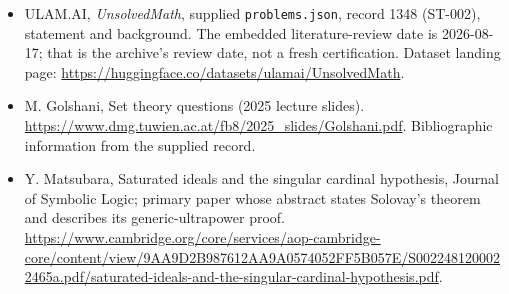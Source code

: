 \documentclass[11pt,a4paper]{article}
\begin{document}
{\small

\begin{itemize}

\item[\hypertarget{source:1348:1}{S1}] ULAM.AI, \emph{UnsolvedMath}, supplied \texttt{problems.json}, record 1348 (ST-002), statement and background. The embedded literature-review date is 2026-08-17; that is the archive’s review date, not a fresh certification. Dataset landing page: \url{https://huggingface.co/datasets/ulamai/UnsolvedMath}.

\item[\hypertarget{source:1348:2}{S2}] M. Golshani, Set theory questions (2025 lecture slides). \url{https://www.dmg.tuwien.ac.at/fb8/2025_slides/Golshani.pdf}. Bibliographic information from the supplied record.

\item[R1] Y. Matsubara, Saturated ideals and the singular cardinal hypothesis, Journal of Symbolic Logic; primary paper whose abstract states Solovay’s theorem and describes its generic-ultrapower proof.
\url{https://www.cambridge.org/core/services/aop-cambridge-core/content/view/9AA9D2B987612AA9A0574052FF5B057E/S0022481200022465a.pdf/saturated-ideals-and-the-singular-cardinal-hypothesis.pdf}.
\end{itemize}

}

\label{end:1348}
\end{document}
